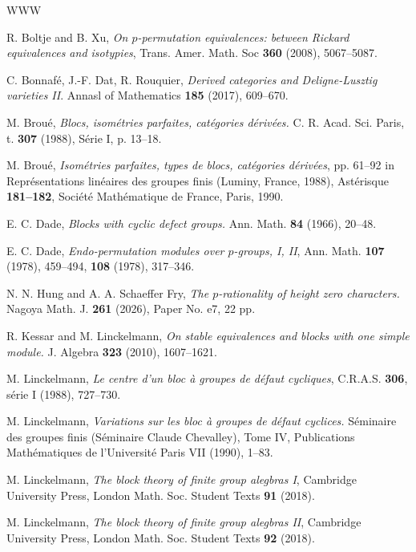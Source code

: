 \documentclass{amsart} %
\theoremstyle{plain}\newtheorem{Theorem}{Theorem}[section]
\theoremstyle{plain}\newtheorem{Conjecture}[Theorem]{Conjecture}
\theoremstyle{plain}\newtheorem{Corollary}[Theorem]{Corollary}
\theoremstyle{plain}\newtheorem{Lemma}[Theorem]{Lemma}
\theoremstyle{plain}\newtheorem{Proposition}[Theorem]{Proposition}
\theoremstyle{definition}\newtheorem{Definition}[Theorem]{Definition}
\theoremstyle{definition}\newtheorem{Example}[Theorem]{Example}
\theoremstyle{definition}\newtheorem{Examples}[Theorem]{Examples}
\theoremstyle{definition}\newtheorem{Remark}[Theorem]{Remark}
\theoremstyle{definition}\newtheorem{Remarks}[Theorem]{Remarks}
\theoremstyle{plain}\newtheorem{Statement}[Theorem]{}
\begin{document}
\begin{thebibliography}{WWW}

 R. Boltje and B. Xu, {\em On $p$-permutation equivalences: 
between Rickard equivalences and isotypies}, Trans. Amer. Math. Soc 
{\bf 360} (2008), 5067--5087.

 C. Bonnaf\'e, J.-F. Dat, R. Rouquier, {\em  Derived categories and
Deligne-Lusztig varieties II}. Annasl of Mathematics {\bf 185} (2017), 609--670.

 M. Brou\'e, {\em Blocs, isom\'etries parfaites, cat\'egories
d\'eriv\'ees.} C. R. Acad. Sci. Paris, t. {\bf 307} (1988), S\'erie I, p. 13--18.

 M. Brou\'e, {\em Isom\'etries parfaites, types de blocs, cat\'egories 
d\'eriv\'ees}, pp. 61--92 in Repr\'esentations lin\'eaires des groupes finis 
(Luminy, France, 1988), Ast\'erisque {\bf 181--182}, Soci\'et\'e 
Math\'ematique de France, Paris, 1990.

  
   E. C. Dade, {\em Blocks with cyclic defect groups.}
Ann. Math. {\bf 84} (1966), 20--48.

  
  E. C. Dade,
{\em Endo-permutation modules over $p$-groups, I,
II}, Ann. Math. {\bf 107} (1978), 459--494, {\bf 108} (1978), 317--346.

 N. N. Hung and  A. A. Schaeffer Fry,
{\em The $p$-rationality of height zero characters.} 
Nagoya Math. J. {\bf 261} (2026), Paper No. e7, 22 pp.


 R. Kessar and M. Linckelmann, {\em On stable equivalences and
blocks with one simple module.} J. Algebra {\bf 323} (2010), 1607--1621.

 M. Linckelmann, {\em Le centre d'un bloc
\`a groupes de d\'efaut cycliques}, C.R.A.S. {\bf 306}, s\'erie
I (1988), 727--730.


 M. Linckelmann, {\em Variations sur les bloc \`a groupes de
d\'efaut cyclices.} S\'eminaire des groupes finis (S\'eminaire Claude Chevalley), Tome IV,
Publications Math\'ematiques de l'Universit\'e Paris VII  (1990), 1--83.

 M. Linckelmann, {\em The block theory of finite group
alegbras I}, Cambridge University Press, London Math. Soc. Student
Texts {\bf 91} (2018). 

 M. Linckelmann, {\em The block theory of finite group
alegbras II}, Cambridge University Press, London Math. Soc. Student
Texts {\bf 92} (2018). 


\end{thebibliography}
\end{document}

